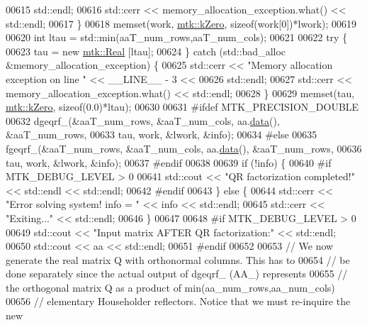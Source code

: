 \begin{DoxyCode}
00615       std::endl;
00616     std::cerr << memory\_allocation\_exception.what() << std::endl;
00617   \}
00618   memset(work, \hyperlink{group__c01-roots_ga59a451a5fae30d59649bcda274fea271}{mtk::kZero}, \textcolor{keyword}{sizeof}(work[0])*lwork);
00619 
00620   \textcolor{keywordtype}{int} ltau = std::min(aaT\_num\_rows,aaT\_num\_cols);
00621 
00622   \textcolor{keywordflow}{try} \{
00623     tau = \textcolor{keyword}{new} \hyperlink{group__c01-roots_gac080bbbf5cbb5502c9f00405f894857d}{mtk::Real} [ltau];
00624   \} \textcolor{keywordflow}{catch} (std::bad\_alloc &memory\_allocation\_exception) \{
00625     std::cerr << \textcolor{stringliteral}{"Memory allocation exception on line "} << \_\_LINE\_\_ - 3 <<
00626       std::endl;
00627     std::cerr << memory\_allocation\_exception.what() << std::endl;
00628   \}
00629   memset(tau, \hyperlink{group__c01-roots_ga59a451a5fae30d59649bcda274fea271}{mtk::kZero}, \textcolor{keyword}{sizeof}(0.0)*ltau);
00630 
00631 \textcolor{preprocessor}{  #ifdef MTK\_PRECISION\_DOUBLE}
00632   dgeqrf\_(&aaT\_num\_rows, &aaT\_num\_cols, aa.\hyperlink{classmtk_1_1DenseMatrix_a0c33b8a9e01d157c61ddbdf807c25d84}{data}(), &aaT\_num\_rows,
00633           tau, work, &lwork, &info);
00634 \textcolor{preprocessor}{  #else}
00635   fgeqrf\_(&aaT\_num\_rows, &aaT\_num\_cols, aa.\hyperlink{classmtk_1_1DenseMatrix_a0c33b8a9e01d157c61ddbdf807c25d84}{data}(), &aaT\_num\_rows,
00636           tau, work, &lwork, &info);
00637 \textcolor{preprocessor}{  #endif}
00638 
00639   \textcolor{keywordflow}{if} (!info) \{
00640 \textcolor{preprocessor}{    #if MTK\_DEBUG\_LEVEL > 0}
00641     std::cout << \textcolor{stringliteral}{"QR factorization completed!"} << std::endl << std::endl;
00642 \textcolor{preprocessor}{    #endif}
00643   \} \textcolor{keywordflow}{else} \{
00644     std::cerr << \textcolor{stringliteral}{"Error solving system! info = "} << info << std::endl;
00645     std::cerr << \textcolor{stringliteral}{"Exiting..."} << std::endl;
00646   \}
00647 
00648 \textcolor{preprocessor}{  #if MTK\_DEBUG\_LEVEL > 0}
00649   std::cout << \textcolor{stringliteral}{"Input matrix AFTER QR factorization:"} << std::endl;
00650   std::cout << aa << std::endl;
00651 \textcolor{preprocessor}{  #endif}
00652 
00653   \textcolor{comment}{// We now generate the real matrix Q with orthonormal columns. This has to}
00654   \textcolor{comment}{// be done separately since the actual output of dgeqrf\_ (AA\_) represents}
00655   \textcolor{comment}{// the orthogonal matrix Q as a product of min(aa\_num\_rows,aa\_num\_cols)}
00656   \textcolor{comment}{// elementary Householder reflectors. Notice that we must re-inquire the new}

\end{DoxyCode}

